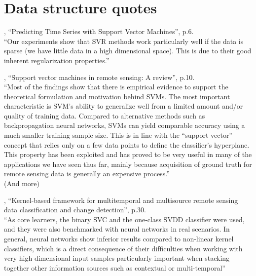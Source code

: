 
\chapter{Data structure quotes}

\cite{muller1997predicting}, ``Predicting Time Series with Support Vector Machines'', p.6. \\
``Our experiments show that SVR methods work particularly well if the data is sparse (\ie we have little data in a high dimensional space). This is due to their good inherent regularization properties.''

\cite{mountrakis2011support}, ``Support vector machines in remote sensing: A review'', p.10. \\
``Most of the findings show that there is empirical evidence to support the theoretical formulation and motivation behind SVMs.
The most important characteristic is SVM’s ability to generalize well from a limited amount and/or quality of training data.
Compared to alternative methods such as backpropagation neural networks, SVMs can yield comparable accuracy using a much smaller training sample size.
This is in line with the ``support vector'' concept that relies only on a few data points to define the classifier's hyperplane.
This property has been exploited and has proved to be very useful in many of the applications we have seen thus far, mainly because acquisition of ground truth for remote sensing data is generally an expensive process.''\\
(And more)

\cite{camps2008kernel}, ``Kernel-based framework for multitemporal and multisource remote sensing data classification and change detection'', p.30. \\
``As core learners, the binary SVC and the one-class SVDD classiﬁer were used, and they were also benchmarked with neural networks in real scenarios.
In general, neural networks show inferior results compared to non-linear kernel classiﬁers, which is a direct consequence of their difﬁculties when working with very high dimensional input samples particularly important when stacking together other information sources such as contextual or multi-temporal''